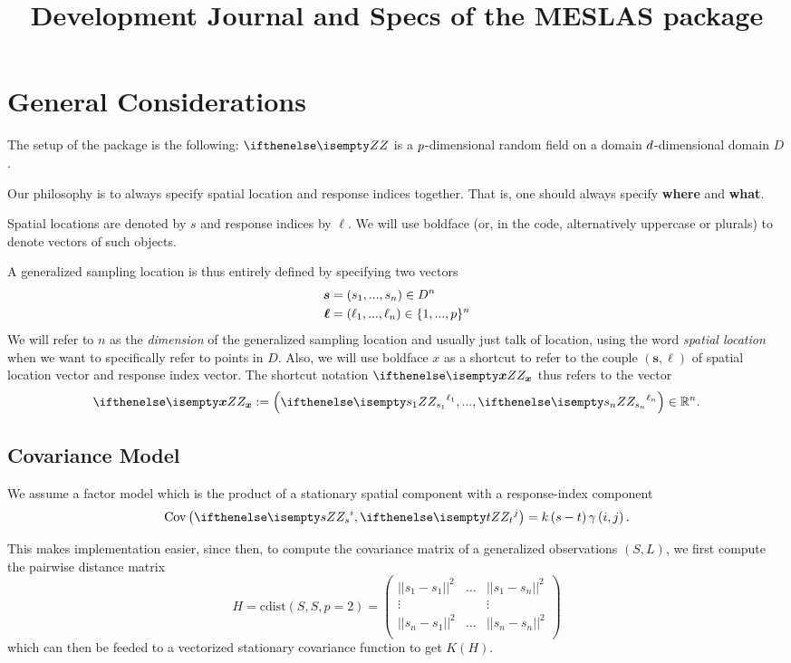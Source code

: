 \documentclass[a4paper,10pt]{article}
\title{Development Journal and Specs of the MESLAS package
}
\begin{document}
\maketitle

\section{General Considerations}
The setup of the package is the following: $\gp$ is a $p$-dimensional random
field on a domain $d$-dimensional
domain $D$.

Our philosophy is to always specify spatial location and response indices
together. That is, one should always specify \textbf{where} and \textbf{what}.

Spatial locations are denoted by $s$ and response indices by $\ell$. We will
use boldface (or, in the code, alternatively uppercase or plurals) to denote
vectors of such objects.

\medskip
A generalized sampling location is thus entirely defined by specifying two vectors
\begin{align*}
    \bm{s} &= \left(s_1, ..., s_n\right)\in D^n\\
    \bm{\ell} &= \left(\ell_1, ..., \ell_n\right) \in \lbrace 1, ..., p
    \rbrace^n
\end{align*}
We will refer to $n$ as the \textit{dimension} of the generalized sampling
location and usually just talk of location, using the word \textit{spatial
location} when we want to specifically refer to points in $D$. Also, we will
use boldface $x$ as a shortcut to refer to the couple $\left(\bm{s},
\bm{\ell}\right)$ of spatial location vector and response index vector.
The shortcut notation $\gp[\bm{x}]$ thus refers to the
vector
\[
    \gp[\bm{x}]:=\left(\gp[s_1]^{\ell_1}, ..., \gp[s_n]^{\ell_n}\right) \in
    \mathbb{R}^n.
\]

\subsection{Covariance Model}
We assume a factor model which is the product of a stationary spatial component
with a response-index component
\begin{equation}
    \textrm{Cov}\left(\gp[s]^i, \gp[t]^j\right) = k\left(s - t\right)
    \gamma\left(i, j\right).
\end{equation}

This makes implementation easier, since then, to compute the covariance matrix
of a generalized observations $\left(S, L\right)$, we first compute the
pairwise distance matrix
\[
    H = \textrm{cdist}\left(S,S, p=2\right) = \begin{pmatrix}
        ||s_1 - s_1||^2 & \dots & ||s_1 - s_n||^2\\
        \vdots &  & \vdots \\
        ||s_n - s_1||^2 & \dots & ||s_n - s_n||^2\\
    \end{pmatrix}
\]
which can then be feeded to a vectorized stationary covariance function to get
$K(H)$.
\end{document}
